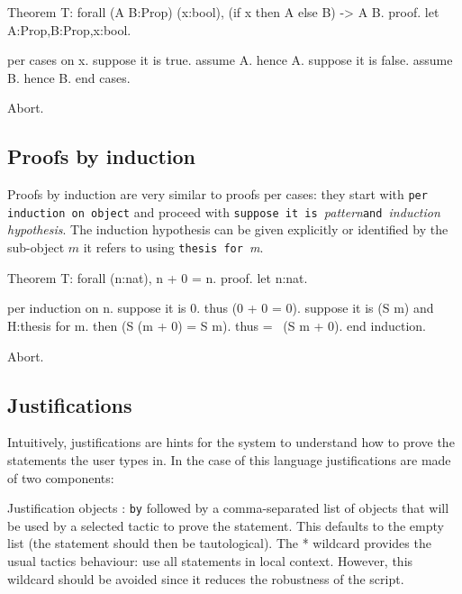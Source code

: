 \begin{coq_eval}
Theorem T: forall (A B:Prop) (x:bool), (if x then A else B) -> A \/ B.
proof.
let A:Prop,B:Prop,x:bool.
\end{coq_eval} 
\begin{coq_example}
per cases on x.
suppose it is true.
  assume A.
  hence A.
suppose it is false.
  assume B.
  hence B.
end cases.
\end{coq_example}
\begin{coq_eval}
Abort.
\end{coq_eval}

\subsection{Proofs by induction} 

Proofs by induction are very similar to proofs per cases: they start
with {\tt per induction on }{\tt object} and proceed with {\tt suppose
  it is }\emph{pattern}{\tt and }\emph{induction hypothesis}. The
induction hypothesis can be given explicitly or identified by the
sub-object $m$ it refers to using {\tt thesis for }\emph{m}. 

\begin{coq_eval}
Theorem T: forall (n:nat), n + 0 = n.
proof.
let n:nat.
\end{coq_eval} 
\begin{coq_example}
per induction on n.
suppose it is 0.
  thus (0 + 0 = 0).
suppose it is (S m) and H:thesis for m.
  then (S (m + 0) = S m).
  thus =~ (S m + 0).
end induction.
\end{coq_example}
\begin{coq_eval}
Abort.
\end{coq_eval}

\subsection{Justifications}\label{justifications}


Intuitively, justifications are hints for the system to understand how
to prove the statements the user types in. In the case of this
language justifications are made of two components:

Justification objects : {\texttt{by}} followed by a comma-{}separated
list of objects that will be used by a selected tactic to prove the
statement. This defaults to the empty list (the statement should then
be tautological). The * wildcard provides the usual tactics behaviour:
use all statements in local context. However, this wildcard should be
avoided since it reduces the robustness of the script.

